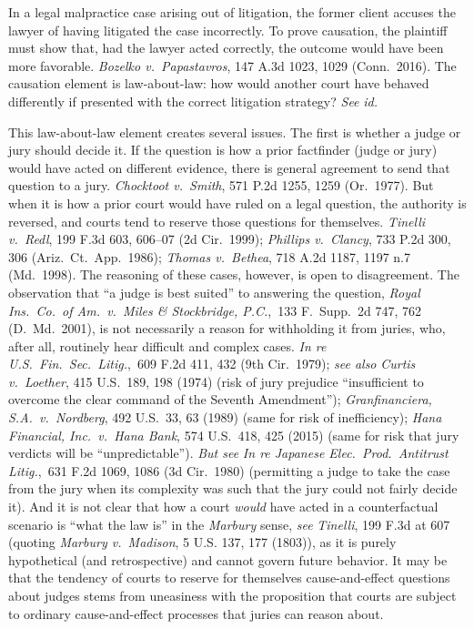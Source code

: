 \documentclass[
  12pt,
  letterpaper,
]{scrartcl}
\begin{document}
In a legal malpractice case arising out of litigation, the former client
accuses the lawyer of having litigated the case incorrectly. To prove
causation, the plaintiff must show that, had the lawyer acted correctly, the
outcome would have been more favorable. \textit{Bozelko v.~Papastavros}, 147
A.3d 1023, 1029 (Conn.~2016). The causation element is law-about-law: how would
another court have behaved differently if presented with the correct litigation
strategy? \textit{See} \textit{id.}

This law-about-law element creates several issues. The first is whether a judge
or jury should decide it. If the question is how a prior factfinder (judge or
jury) would have acted on different evidence, there is general agreement to
send that question to a jury. \textit{Chocktoot v.~Smith}, 571 P.2d 1255, 1259
(Or.~1977). But when it is how a prior court would have ruled on a legal
question, the authority is reversed, and courts tend to reserve those questions
for themselves. \textit{Tinelli v.~Redl}, 199 F.3d 603, 606--07 (2d Cir.~1999);
\textit{Phillips v.~Clancy}, 733 P.2d 300, 306 (Ariz.~Ct.~App.~1986);
\textit{Thomas v.~Bethea}, 718 A.2d 1187, 1197 n.7 (Md.~1998). The reasoning of
these cases, however, is open to disagreement. The observation that ``a judge
is best suited'' to answering the question, \textit{Royal Ins.~Co.~of
Am.~v.~Miles \& Stockbridge, P.C.},~133 F.~Supp.~2d 747, 762 (D.~Md.~2001), is
not necessarily a reason for withholding it from juries, who, after all,
routinely hear difficult and complex cases. \textit{In re
U.S.~Fin.~Sec.~Litig.},~609 F.2d 411, 432 (9th Cir.~1979); \textit{see also}
\textit{Curtis v.~Loether}, 415 U.S.~189, 198 (1974) (risk of jury prejudice
``insufficient to overcome the clear command of the Seventh Amendment'');
\textit{Granfinanciera, S.A.~v.~Nordberg}, 492 U.S.~33, 63 (1989) (same for
risk of inefficiency); \textit{Hana Financial, Inc.~v.~Hana Bank}, 574
U.S.~418, 425 (2015) (same for risk that jury verdicts will be
``unpredictable''). \textit{But see} \textit{In re Japanese
Elec.~Prod.~Antitrust Litig.},~631 F.2d 1069, 1086 (3d Cir.~1980) (permitting a
judge to take the case from the jury when its complexity was such that the jury
could not fairly decide it). And it is not clear that how a court \emph{would}
have acted in a counterfactual scenario is ``what the law is'' in the
\textit{Marbury} sense, \textit{see} \textit{Tinelli}, 199 F.3d at 607 (quoting
\textit{Marbury v.~Madison}, 5 U.S. 137, 177 (1803)), as it is purely
hypothetical (and retrospective) and cannot govern future behavior. It may be
that the tendency of courts to reserve for themselves cause-and-effect
questions about judges stems from uneasiness with the proposition that courts
are subject to ordinary cause-and-effect processes that juries can reason
about.
\end{document}
